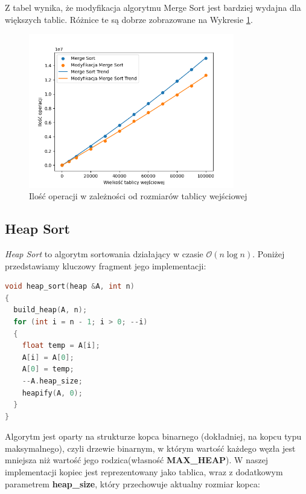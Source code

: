 \documentclass{article}
\newcommand{\bigO}{\mathcal{O}}
\begin{document}
Z tabel wynika, że modyfikacja algorytmu Merge Sort jest bardziej wydajna dla większych tablic. Różnice te są dobrze zobrazowane na Wykresie \ref{fig:merge}.

\begin{figure}[H]
    \centering
    \includegraphics[width=0.8\textwidth]{Figure_2.png}
    \caption{Ilość operacji w zależności od rozmiarów tablicy wejściowej}
    \label{fig:merge}
\end{figure}
\subsection{Heap Sort}
\textit{Heap Sort} to algorytm sortowania działający w czasie \( \bigO (n \log n) \). Poniżej przedstawiamy kluczowy fragment jego implementacji:
\begin{lstlisting}[style=mystyle, language=C++, caption={Implementacja Heap Sort}, label={lst:heapsort}]
void heap_sort(heap &A, int n)
{
  build_heap(A, n);
  for (int i = n - 1; i > 0; --i)
  {
    float temp = A[i];
    A[i] = A[0];
    A[0] = temp;
    --A.heap_size;
    heapify(A, 0);
  }
}
\end{lstlisting}
Algorytm jest oparty na strukturze kopca binarnego (dokładniej, na kopcu typu maksymalnego), czyli drzewie binarnym, w którym wartość każdego węzła jest mniejsza niż wartość jego rodzica(własność \textbf{MAX\_HEAP}). W naszej implementacji kopiec jest reprezentowany jako tablica, wraz z dodatkowym parametrem \textbf{heap\_size}, który przechowuje aktualny rozmiar kopca:

\newpage
\end{document}
